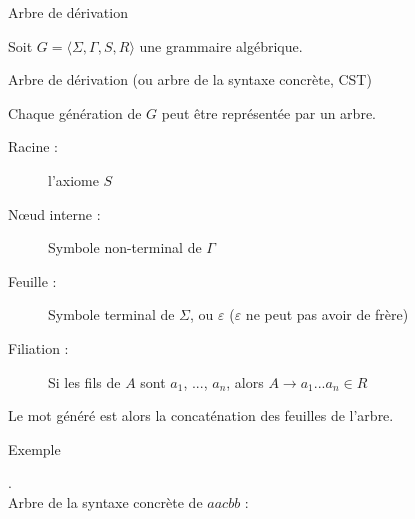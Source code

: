 
\begingroup

\begin{frame}{Arbre de dérivation }

  Soit \alert{$G = \langle \Sigma, \Gamma, S, R \rangle$} une grammaire algébrique.

  \begin{block}{Arbre de dérivation (ou arbre de la syntaxe concrète, CST)}

    Chaque génération de $G$ peut être représentée par un arbre.

    \begin{description}
    \item[Racine :] l'axiome $S$\\
    \item[N\oe ud interne :] Symbole non-terminal de $\Gamma$
    \item[Feuille :] Symbole terminal de $\Sigma$, ou $\varepsilon$ ($\varepsilon$ ne peut pas avoir de frère)
    \item[Filiation :] Si les fils de $A$ sont $a_1$, ..., $a_n$, alors $A \rightarrow a_1...a_n \in R$
    \end{description}
    Le mot généré est alors la concaténation des feuilles de l'arbre.
  \end{block}



  \begin{exampleblock}{Exemple}

    \vspace{-5mm}
    \begin{minipage}{.8\textwidth}
      .\\

      \vspace{2mm}
      Arbre de la syntaxe concrète de $aacbb$ :
    \end{minipage}%
    \begin{minipage}{.2\textwidth}
      \vspace{-2mm}
\end{minipage}
\end{exampleblock}
\end{frame}
